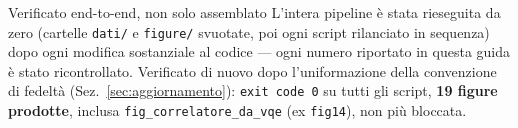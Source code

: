 \documentclass[11pt,a4paper]{article}
\newcommand{\code}[1]{\texttt{\small #1}}
\begin{document}
\begin{okbox}{Verificato end-to-end, non solo assemblato}
L'intera pipeline è stata rieseguita da zero (cartelle \code{dati/} e
\code{figure/} svuotate, poi ogni script rilanciato in sequenza) dopo
ogni modifica sostanziale al codice --- ogni numero riportato in questa
guida è stato ricontrollato. Verificato di nuovo dopo l'uniformazione
della convenzione di fedeltà (Sez.~\ref{sec:aggiornamento}):
\code{exit code 0} su tutti gli script, \textbf{19 figure prodotte},
inclusa \code{fig\_correlatore\_da\_vqe} (ex \code{fig14}), non più
bloccata.
\end{okbox}
\end{document}
